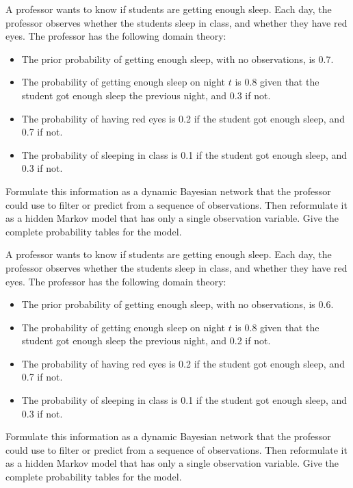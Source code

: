 
\begin{uexercise}
A professor wants to know if students are getting enough sleep.  Each day,
the professor observes
whether the students sleep in class, and whether they have red eyes.
The professor has the following domain theory:
\begin{itemize}
\item The prior probability of getting enough sleep, with no observations, is 0.7.
\item The probability of getting enough sleep on night \(t\) is 0.8 given
that the student got enough sleep the previous night, and 0.3 if not.
\item The probability of having red eyes is 0.2 if the student got enough sleep,
and 0.7 if not.
\item The probability of sleeping in class is 0.1 if the student got enough sleep,
and 0.3 if not.
\end{itemize}
Formulate this information as a dynamic Bayesian network that the professor could use to 
filter or predict from a sequence of observations.  Then reformulate it as a
hidden Markov model that has only a single observation variable.  Give the complete
probability tables for the model.
\end{uexercise} 

\begin{iexercise}
A professor wants to know if students are getting enough sleep.  Each day,
the professor observes
whether the students sleep in class, and whether they have red eyes.
The professor has the following domain theory:
\begin{itemize}
\item The prior probability of getting enough sleep, with no observations, is 0.6.
\item The probability of getting enough sleep on night \(t\) is 0.8 given
that the student got enough sleep the previous night, and 0.2 if not.
\item The probability of having red eyes is 0.2 if the student got enough sleep,
and 0.7 if not.
\item The probability of sleeping in class is 0.1 if the student got enough sleep,
and 0.3 if not.
\end{itemize}
Formulate this information as a dynamic Bayesian network that the professor could use to 
filter or predict from a sequence of observations.  Then reformulate it as a
hidden Markov model that has only a single observation variable.  Give the complete
probability tables for the model.
\end{iexercise} 

